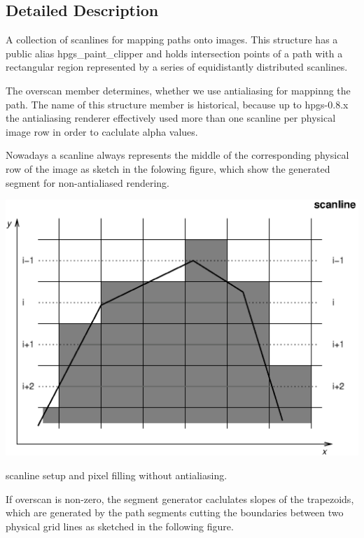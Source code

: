 \subsection{Detailed Description}
A collection of scanlines for mapping paths onto images. This structure has a public alias {\ttfamily hpgs\_\-paint\_\-clipper} and holds intersection points of a path with a rectangular region represented by a series of equidistantly distributed scanlines.

The {\ttfamily overscan} member determines, whether we use antialiasing for mappinng the path. The name of this structure member is historical, because up to {\ttfamily hpgs-\/0.8.x} the antialiasing renderer effectively used more than one scanline per physical image row in order to caclulate alpha values.

Nowadays a scanline always represents the middle of the corresponding physical row of the image as sketch in the folowing figure, which show the generated segment for non-\/antialiased rendering.

 
\begin{DoxyImage}
\includegraphics{scanline_0}
\caption{scanline setup and pixel filling without antialiasing.}
\end{DoxyImage}
 If {\ttfamily overscan} is non-\/zero, the segment generator caclulates slopes of the trapezoids, which are generated by the path segments cutting the boundaries between two physical grid lines as sketched in the following figure.

